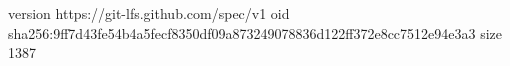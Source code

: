 version https://git-lfs.github.com/spec/v1
oid sha256:9ff7d43fe54b4a5fecf8350df09a873249078836d122ff372e8cc7512e94e3a3
size 1387
